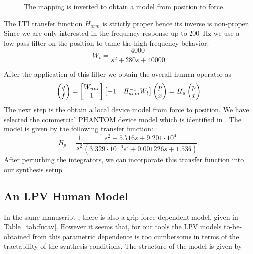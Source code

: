 \begin{figure}%
\centering

\caption{The mapping is inverted to obtain a model from position to force.}%
\label{fig:invidentifiedmodel}%
\end{figure}


The LTI transfer function $H_{arm}$ is strictly proper hence its inverse is non-proper. Since we are only interested in the frequency response up to \SI{200}{\hertz} we use a low-pass filter on the position to tame the high frequency behavior. 
\[
W_{t} = \frac{4000}{s^2 + 280 s + 40000}
\]

After the application of this filter we obtain the overall human operator as
\[
\begin{pmatrix}q\\f\end{pmatrix} = \begin{bmatrix}W_{unc}\\1\end{bmatrix}\begin{bmatrix}-1 &H_{arm}^{-1}W_t\end{bmatrix}\begin{pmatrix}p\\x\end{pmatrix} = H_u \begin{pmatrix}p\\x\end{pmatrix}
\]
The next step is the obtain a local device model from force to position. We have selected the commercial PHANTOM device model which is identified in \cite{cavusfeygintendick}. The model is given by the following transfer function: 
\[
H_p = \frac{1}{s^2}\frac{s^2 + 5.716 s + 9.201\cdot 10^{4}}{(3.329\cdot 10^{-6} s^2 + 0.001226 s+1.536)}.
\]
After perturbing the integrators, we can incorporate this transfer function into our synthesis setup. 


\subsection{An LPV Human Model}

In the same manuscript \cite{fucavus}, there is also a grip force dependent model, given in Table~\ref{tab:fucav}. However it seems 
that, for our tools the LPV models to-be-obtained from this parametric dependence is too cumbersome in terms of the tractability 
of the synthesis conditions. The structure of the model is given by

